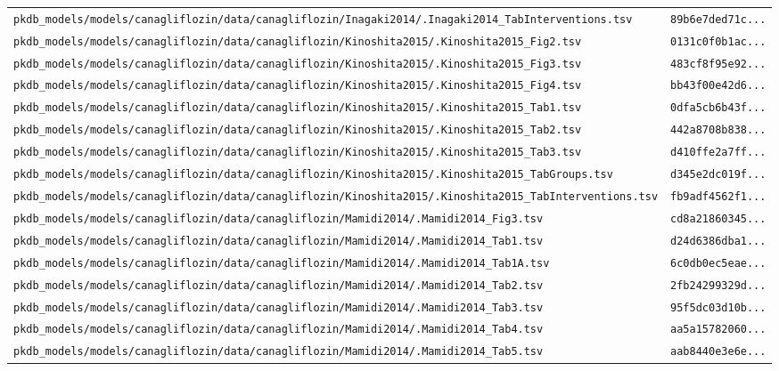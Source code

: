 \begin{longtable}{ll}
\texttt{pkdb\_models/models/canagliflozin/data/canagliflozin/Inagaki2014/.Inagaki2014\_TabInterventions.tsv} & \texttt{89b6e7ded71c...} \\
\texttt{pkdb\_models/models/canagliflozin/data/canagliflozin/Kinoshita2015/.Kinoshita2015\_Fig2.tsv} & \texttt{0131c0f0b1ac...} \\
\texttt{pkdb\_models/models/canagliflozin/data/canagliflozin/Kinoshita2015/.Kinoshita2015\_Fig3.tsv} & \texttt{483cf8f95e92...} \\
\texttt{pkdb\_models/models/canagliflozin/data/canagliflozin/Kinoshita2015/.Kinoshita2015\_Fig4.tsv} & \texttt{bb43f00e42d6...} \\
\texttt{pkdb\_models/models/canagliflozin/data/canagliflozin/Kinoshita2015/.Kinoshita2015\_Tab1.tsv} & \texttt{0dfa5cb6b43f...} \\
\texttt{pkdb\_models/models/canagliflozin/data/canagliflozin/Kinoshita2015/.Kinoshita2015\_Tab2.tsv} & \texttt{442a8708b838...} \\
\texttt{pkdb\_models/models/canagliflozin/data/canagliflozin/Kinoshita2015/.Kinoshita2015\_Tab3.tsv} & \texttt{d410ffe2a7ff...} \\
\texttt{pkdb\_models/models/canagliflozin/data/canagliflozin/Kinoshita2015/.Kinoshita2015\_TabGroups.tsv} & \texttt{d345e2dc019f...} \\
\texttt{pkdb\_models/models/canagliflozin/data/canagliflozin/Kinoshita2015/.Kinoshita2015\_TabInterventions.tsv} & \texttt{fb9adf4562f1...} \\
\texttt{pkdb\_models/models/canagliflozin/data/canagliflozin/Mamidi2014/.Mamidi2014\_Fig3.tsv} & \texttt{cd8a21860345...} \\
\texttt{pkdb\_models/models/canagliflozin/data/canagliflozin/Mamidi2014/.Mamidi2014\_Tab1.tsv} & \texttt{d24d6386dba1...} \\
\texttt{pkdb\_models/models/canagliflozin/data/canagliflozin/Mamidi2014/.Mamidi2014\_Tab1A.tsv} & \texttt{6c0db0ec5eae...} \\
\texttt{pkdb\_models/models/canagliflozin/data/canagliflozin/Mamidi2014/.Mamidi2014\_Tab2.tsv} & \texttt{2fb24299329d...} \\
\texttt{pkdb\_models/models/canagliflozin/data/canagliflozin/Mamidi2014/.Mamidi2014\_Tab3.tsv} & \texttt{95f5dc03d10b...} \\
\texttt{pkdb\_models/models/canagliflozin/data/canagliflozin/Mamidi2014/.Mamidi2014\_Tab4.tsv} & \texttt{aa5a15782060...} \\
\texttt{pkdb\_models/models/canagliflozin/data/canagliflozin/Mamidi2014/.Mamidi2014\_Tab5.tsv} & \texttt{aab8440e3e6e...} \\

\end{longtable}
